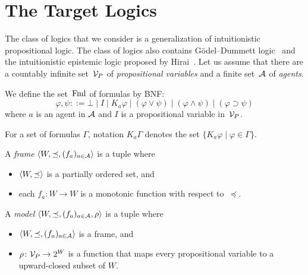 \section{The Target Logics}
 \label{logic}

The class of logics that we consider is a generalization of
intuitionistic propositional logic.
The class of logics also contains G\"{o}del--Dummett logic~\cite{dummett59}
and the intuitionistic epistemic logic proposed by 
Hirai~\cite{hirailpar}.
Let us assume that
there are a countably infinite set~$\mathcal V_P$ of \textit{propositional variables} and a 
finite set~$\mathcal A$ of \textit{agents}. 

\begin{definition}
We define the set~$\operatorname{Fml}$ of formulas by BNF:
\[
 \varphi,\psi ::= \bot\mid I\mid K_a\varphi\mid (\varphi\vee\psi)\mid
 (\varphi\wedge\psi)\mid (\varphi\supset\psi)
\]
 where $a$ is an agent in $\mathcal A$
 and $I$ is a propositional variable in~$\mathcal V_P$.
\end{definition}

For a set of formulas $\Gamma\!$, notation $K_a\Gamma$ denotes the set
$\{K_a\varphi\mid\varphi\in\Gamma\}$\enspace.

\begin{definition}
A \textit{frame} $\langle{W,\preceq,(f_a)_{a\in \mathcal A}}\rangle$ is a tuple where
\begin{itemize}
 \item $\langle{W,\preceq}\rangle$ is a partially ordered set, and
 \item each $f_a\colon W\rightarrow W$ is a monotonic function with
       respect to~$\preceq$.
\end{itemize} 
\end{definition}

\begin{definition}
A \textit{model} $\langle{W,\preceq, (f_a)_{a\in \mathcal A},\rho}\rangle$ is a tuple where
\begin{itemize}
 \item $\langle{W,\preceq,(f_a)_{a\in \mathcal A}}\rangle$ is a frame, and
 \item $\rho\colon \mathcal V_P\rightarrow 2^W$ is a function that maps every
       propositional variable to a upward-closed subset of $W\!$.
\end{itemize}
\end{definition}

